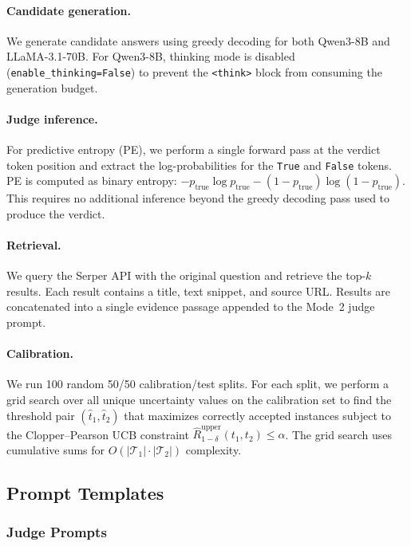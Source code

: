 \paragraph{Candidate generation.}
We generate candidate answers using greedy decoding for both Qwen3-8B and LLaMA-3.1-70B. For Qwen3-8B, thinking mode is disabled (\texttt{enable\_thinking=False}) to prevent the \texttt{<think>} block from consuming the generation budget.

\paragraph{Judge inference.}
For predictive entropy (PE), we perform a single forward pass at the verdict token position and extract the log-probabilities for the \texttt{True} and \texttt{False} tokens. PE is computed as binary entropy: $-p_{\text{true}} \log p_{\text{true}} - (1 - p_{\text{true}}) \log (1 - p_{\text{true}})$. This requires no additional inference beyond the greedy decoding pass used to produce the verdict.

\paragraph{Retrieval.}
We query the Serper API with the original question and retrieve the top-$k$ results. Each result contains a title, text snippet, and source URL. Results are concatenated into a single evidence passage appended to the Mode~2 judge prompt.

\paragraph{Calibration.}
We run 100 random 50/50 calibration/test splits. For each split, we perform a grid search over all unique uncertainty values on the calibration set to find the threshold pair $(\hat{t}_1, \hat{t}_2)$ that maximizes correctly accepted instances subject to the Clopper--Pearson UCB constraint $\hat{R}^{\mathrm{upper}}_{1-\delta}(t_1, t_2) \leq \alpha$. The grid search uses cumulative sums for $O(|\mathcal{T}_1| \cdot |\mathcal{T}_2|)$ complexity.

\subsection{Prompt Templates}
\label{app:prompts}

\subsubsection{Judge Prompts}
